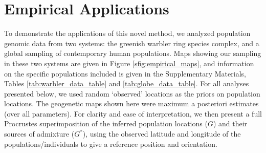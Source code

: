 \documentclass[12pt]{article}
\newcommand{\identifyadmixsource}[1]{{#1^{*}}}
\begin{document}
\section*{Empirical Applications}
To demonstrate the applications of this novel method, we analyzed population genomic data from two systems: the greenish warbler ring species complex, and a global sampling of contemporary human populations.  Maps showing our sampling in these two systems are given in Figure \ref{sfig:empirical_maps}, and information on the specific populations included is given in the Supplementary Materials, Tables \ref{tab:warbler_data_table} and \ref{tab:globe_data_table}.  
For all analyses presented below, we used random `observed' locations as the priors on population locations.
The geogenetic maps shown here were maximum a posteriori estimates (over all parameters). For clarity and ease of interpretation, we then present a full Procrustes superimposition of the inferred population locations ($G$) and their sources of admixture ($\identifyadmixsource{G}$), using the observed latitude and longitude of the populations/individuals to give a reference position and orientation.
\end{document}
